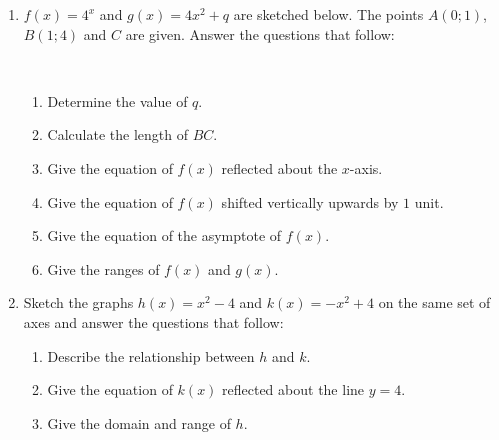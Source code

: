\begin{eocexercises}{}
\begin{enumerate}[noitemsep, label=\textbf{\arabic*}. ]
  \item$f(x)=4^x$ and $g(x)=4x^2+q$ are sketched below. The points $A(0;1)$, $B(1;4)$ and $C$ are given. Answer the questions that follow:
  \begin{center}  
\end{center}
    \\
    \begin{enumerate}[noitemsep, label=\textbf{(\alph*)} ]
    \item Determine the value of $q$.
    \item Calculate the length of $BC$.
    \item Give the equation of $f(x)$ reflected about the $x$-axis.
    \item Give the equation of $f(x)$ shifted vertically upwards by $1$ unit.
    \item Give the equation of the asymptote of $f(x)$.
\item Give the ranges of $f(x)$ and $g(x)$.
    \end{enumerate}
    
  \item Sketch the graphs $h(x)=x^2-4$ and $k(x)=-x^2+4$ on the same set of axes and answer the questions that follow: 
    \begin{enumerate}[noitemsep, label=\textbf{(\alph*)} ]
    \item Describe the relationship between $h$ and $k$.
    \item Give the equation of $k(x)$ reflected about the line $y=4$.
    \item Give the domain and range of $h$.
    \end{enumerate}
    

\end{enumerate}
\end{eocexercises}
